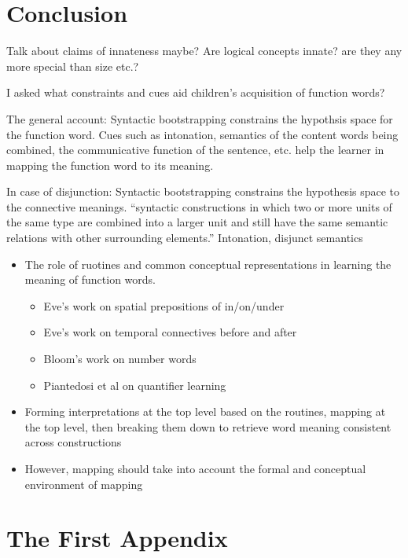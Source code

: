 \documentclass[oneside]{report}
\theoremstyle{definition}
\theoremstyle{definition}
\theoremstyle{definition}
\theoremstyle{remark}
\begin{document}
\chapter{Conclusion}\label{conclusions}

Talk about claims of innateness maybe? Are logical concepts innate? are
they any more special than size etc.?

I asked what constraints and cues aid children's acquisition of function
words?

The general account: Syntactic bootstrapping constrains the hypothsis
space for the function word. Cues such as intonation, semantics of the
content words being combined, the communicative function of the
sentence, etc. help the learner in mapping the function word to its
meaning.

In case of disjunction: Syntactic bootstrapping constrains the
hypothesis space to the connective meanings. ``syntactic constructions
in which two or more units of the same type are combined into a larger
unit and still have the same semantic relations with other surrounding
elements.'' Intonation, disjunct semantics
\begin{itemize}
\tightlist
\item
  The role of ruotines and common conceptual representations in learning
  the meaning of function words.
  \begin{itemize}
  \tightlist
  \item
    Eve's work on spatial prepositions of in/on/under
  \item
    Eve's work on temporal connectives before and after
  \item
    Bloom's work on number words
  \item
    Piantedosi et al on quantifier learning
  \end{itemize}
\item
  Forming interpretations at the top level based on the routines,
  mapping at the top level, then breaking them down to retrieve word
  meaning consistent across constructions
\item
  However, mapping should take into account the formal and conceptual
  environment of mapping
\end{itemize}
\appendix

\chapter{The First Appendix}\label{the-first-appendix}
\end{document}
